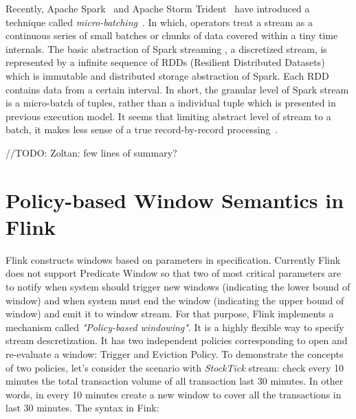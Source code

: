 

Recently, Apache Spark~\citep{spark} and Apache Storm Trident~\citep{storm} have introduced a technique called \textit{micro-batching}~\citep{Zaharia:2012}. In which, operators treat a stream as a continuous series of small batches or chunks of data covered within a tiny time internals. The basic abstraction of Spark streaming , a discretized stream,  is represented by a infinite sequence of RDDs (Resilient Distributed Datasets) which is immutable and distributed storage abstraction of Spark. Each RDD contains data from a certain interval. In short, the granular level of Spark stream is a micro-batch of tuples, rather than a individual tuple which is presented in previous execution model. It seems that limiting abstract level of stream to a batch, it makes less sense of a true record-by-record processing~\citep{Shahrivari:2014}.


//TODO: Zoltan: few lines of summary?


\section{Policy-based Window Semantics in Flink}


Flink constructs windows based on parameters in specification. Currently Flink does not support Predicate Window so that two of most critical parameters are to notify when system should trigger new windows (indicating the lower bound of window) and when system must end the window (indicating the upper bound of window) and emit it to window stream. For that purpose, Flink implements a mechanism called \textit{"Policy-based windowing"}. It is a highly flexible way to specify stream descretization. It has two independent policies corresponding to open and re-evaluate a window: Trigger and Eviction Policy.
To demonstrate the concepts of two policies, let's consider the scenario with \textit{StockTick} stream: check every 10 minutes the total transaction volume of all transaction last 30 minutes. In other words, in every 10 minutes create a new window to cover all the transactions in last 30 minutes. The syntax in Fink:

